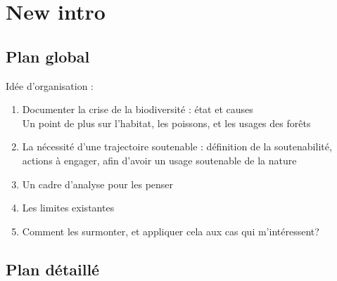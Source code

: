\section{New intro}
\subsection{Plan global}
Idée d'organisation : 
\begin{enumerate}
\item Documenter la crise de la biodiversité : état et causes\\
Un point de plus sur l'habitat, les poissons, et les usages des forêts
\item La nécessité d'une trajectoire soutenable : définition de la soutenabilité, actions à engager, afin d'avoir un usage soutenable de la nature
\item Un cadre d'analyse pour les penser
\item Les limites existantes
\item Comment les surmonter, et appliquer cela aux cas qui m'intéressent?
\end{enumerate}
\subsection{Plan détaillé}

 
 




